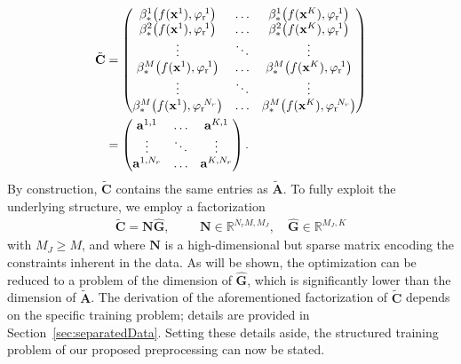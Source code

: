 \documentclass[onefignum,onetabnum]{siamart251104}
\newcommand{\bv}[1]{{\mathbf #1}}
\newcommand{\bt}[1]{{\mathbf{#1}}}
\newcommand{\rom}[1]{{{#1}_{\rm{r}}}}
\newcommand{\Nr}{{N_r}}
\newcommand{\R}{\mathbb{R}}
\newcommand{\tL}{{\fs{\varphi}}}
\newcommand{\fs}[1]{{{#1}}} %
\newcommand{\Ap}{{\bt{A}}}
\newcommand{\vAp}{\bv{a}}
\newcommand{\Cp}{{\bt{C}}}
\begin{document}
{\small
\begin{align}
\begin{split}\label{eq:C-data}
\tilde{\Cp} &=
\begin{pmatrix}
\beta_{\rm *}^1\!\left(f(\bv{x}^1), \rom{\tL}^{\!1}\right) & \ldots & \beta_{\rm *}^1\!\left(f(\bv{x}^K), \rom{\tL}^{\!1}\right) \\
\beta_{\rm *}^2\!\left(f(\bv{x}^1), \rom{\tL}^{\!1}\right) & \ldots & \beta_{\rm *}^2\!\left(f(\bv{x}^K), \rom{\tL}^{\!1}\right) \\
\vdots & \ddots & \vdots \\
\beta_{\rm *}^M\!\left(f(\bv{x}^1), \rom{\tL}^{\!1}\right) & \ldots & \beta_{\rm *}^M\!\left(f(\bv{x}^K), \rom{\tL}^{\!1}\right) \\
\vdots & \ddots & \vdots \\
\beta_{\rm *}^M\!\left(f(\bv{x}^1), \rom{\tL}^{\!\Nr}\right) & \ldots & \beta_{\rm *}^M\!\left(f(\bv{x}^K), \rom{\tL}^{\!\Nr}\right)
\end{pmatrix} \\
&=
\begin{pmatrix}
\vAp^{1,1} & \ldots & \vAp^{K,1} \\
\vdots & \ddots & \vdots \\
\vAp^{1,\Nr} & \ldots & \vAp^{K,\Nr}
\end{pmatrix}.
\end{split}
\end{align}
}%
By construction, $\tilde{\Cp}$ contains the same entries as $\tilde{\Ap}$. To fully exploit the underlying structure, we employ a factorization 
\begin{align*}
\tilde{\Cp} = {\bt{N}} \hat{\bt{G}}, \hspace{1cm} \bt{N} \in \R^{N_r M, M_J}, \quad \hat{\bt{G}} \in \R^{M_J,K}
\end{align*}
with $M_J \geq M$, and where $\bt{N}$ is a high-dimensional but sparse matrix encoding the constraints inherent in the data. As will be shown, the optimization can be reduced to a problem of the dimension of $\hat{\bt{G}}$, which is significantly lower than the dimension of $\tilde{\Ap}$. The derivation of the aforementioned factorization of $\tilde{\Cp}$ depends on the specific training problem; details are provided in Section~\ref{sec:separatedData}. Setting these details aside, the structured training problem of our proposed preprocessing can now be stated.
\end{document}
